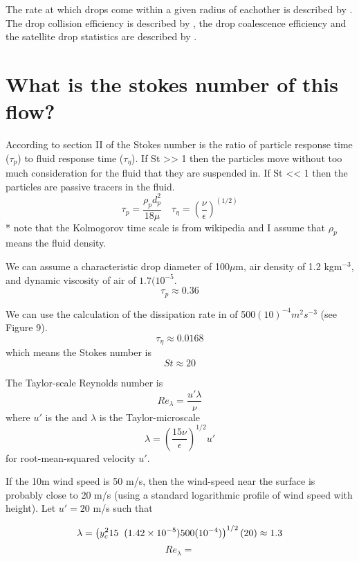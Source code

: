 \documentclass[10pt,a4paper]{article}
\begin{document}
The rate at which drops come within a given radius of eachother is described by \citet{Choi2016}. The drop collision efficiency is described by \citet{Pruppacher1978}, the drop coalescence efficiency and the satellite drop statistics are described by \citet{Beard2001}.

\section*{What is the stokes number of this flow?}

According to section II of \citet{Choi2016} the Stokes number is the ratio of particle response time ($\tau_p$) to fluid response time ($\tau_\eta$). If St >> 1 then the particles move without too much consideration for the fluid that they are suspended in. If St << 1 then the particles are passive tracers in the fluid. 
\[\tau_p = \frac{\rho_p d_p^2}{18\mu} \quad \tau_\eta = \left(\frac{\nu}{\epsilon}\right)^{(1/2)}\]
* note that the Kolmogorov time scale is from wikipedia and I assume that $\rho_p$ means the fluid density. 

We can assume a characteristic drop diameter of 100$\mu$m, air density of 1.2 kgm$^{-3}$, and dynamic viscosity of air of $1.7(10^{-5}$.
\[\tau_p \approx 0.36\]

We can use the calculation of the dissipation rate in \citet{zhang2009} of 500$(10)^{-4}m^2s^{-3}$ (see Figure 9).
\[\tau_\eta \approx 0.0168\]
which means the Stokes number is 
\[ St \approx 20 \]

The Taylor-scale Reynolds number is 
\[Re_\lambda = \frac{u'\lambda}{\nu} \]
where $u'$ is the and $\lambda$ is the Taylor-microscale
\[\lambda = \left(\frac{15 \nu}{\epsilon}\right)^{1/2}u' \]
for root-mean-squared velocity $u'$.

If the 10m wind speed is 50 m/s, then the wind-speed near the surface is probably close to 20 m/s (using a standard logarithmic profile of wind speed with height). Let $u'=20$ m/s such that 

\[\lambda = \left(\frac{15 \hspace*{2mm}(1.42\times10^{-5}) }{500(10^{-4})}\right)^{1/2}(20) \approx 1.3\]
\[Re_\lambda = \]




























\end{document}
